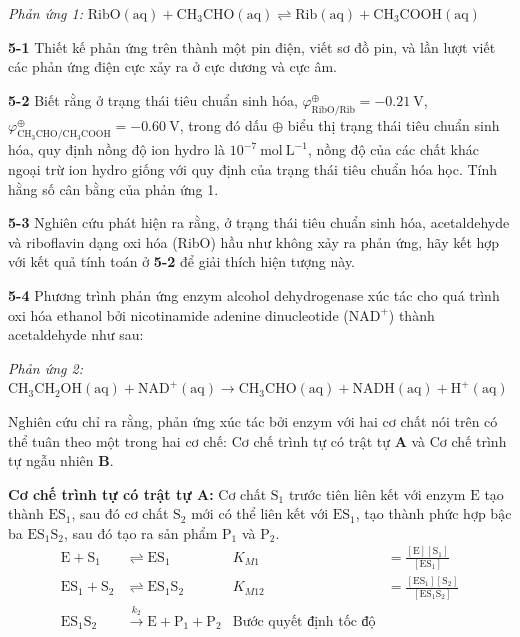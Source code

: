 \textit{Phản ứng 1:} $\mathrm{RibO(aq) + CH_3CHO(aq) \rightleftharpoons Rib(aq) + CH_3COOH(aq)}$

\vspace{0.2cm}

\noindent
\textbf{5-1} Thiết kế phản ứng trên thành một pin điện, viết sơ đồ pin, và lần lượt viết các phản ứng điện cực xảy ra ở cực dương và cực âm.

\vspace{0.2cm}

\noindent
\textbf{5-2} Biết rằng ở trạng thái tiêu chuẩn sinh hóa, $\varphi^\oplus_{\mathrm{RibO/Rib}} = -0.21\ \mathrm{V}$, $\varphi^\oplus_{\mathrm{CH_3CHO/CH_3COOH}} = -0.60\ \mathrm{V}$, trong đó dấu $\oplus$ biểu thị trạng thái tiêu chuẩn sinh hóa, quy định nồng độ ion hydro là $10^{-7}\ \mathrm{mol\ L^{-1}}$, nồng độ của các chất khác ngoại trừ ion hydro giống với quy định của trạng thái tiêu chuẩn hóa học. Tính hằng số cân bằng của phản ứng 1.

\vspace{0.2cm}

\noindent
\textbf{5-3} Nghiên cứu phát hiện ra rằng, ở trạng thái tiêu chuẩn sinh hóa, acetaldehyde và riboflavin dạng oxi hóa (RibO) hầu như không xảy ra phản ứng, hãy kết hợp với kết quả tính toán ở \textbf{5-2} để giải thích hiện tượng này.

\vspace{0.2cm}

\noindent
\textbf{5-4} Phương trình phản ứng enzym alcohol dehydrogenase xúc tác cho quá trình oxi hóa ethanol bởi nicotinamide adenine dinucleotide ($\mathrm{NAD^+}$) thành acetaldehyde như sau:

\textit{Phản ứng 2:} $\mathrm{CH_3CH_2OH(aq) + NAD^+(aq) \rightarrow CH_3CHO(aq) + NADH(aq) + H^+(aq)}$

Nghiên cứu chỉ ra rằng, phản ứng xúc tác bởi enzym với hai cơ chất nói trên có thể tuân theo một trong hai cơ chế: Cơ chế trình tự có trật tự \textbf{A} và Cơ chế trình tự ngẫu nhiên \textbf{B}.

\vspace{0.2cm}

\noindent
\textbf{Cơ chế trình tự có trật tự A:} Cơ chất $\mathrm{S_1}$ trước tiên liên kết với enzym $\mathrm{E}$ tạo thành $\mathrm{ES_1}$, sau đó cơ chất $\mathrm{S_2}$ mới có thể liên kết với $\mathrm{ES_1}$, tạo thành phức hợp bậc ba $\mathrm{ES_1S_2}$, sau đó tạo ra sản phẩm $\mathrm{P_1}$ và $\mathrm{P_2}$.
\begin{align*}
    \mathrm{E} + \mathrm{S_1} &\rightleftharpoons \mathrm{ES_1} & K_{M1} &= \frac{[\mathrm{E}][\mathrm{S_1}]}{[\mathrm{ES_1}]} \\
    \mathrm{ES_1} + \mathrm{S_2} &\rightleftharpoons \mathrm{ES_1S_2} & K_{M12} &= \frac{[\mathrm{ES_1}][\mathrm{S_2}]}{[\mathrm{ES_1S_2}]} \\
    \mathrm{ES_1S_2} &\xrightarrow{k_2} \mathrm{E} + \mathrm{P_1} + \mathrm{P_2} & \text{Bước quyết định tốc độ}
\end{align*}

